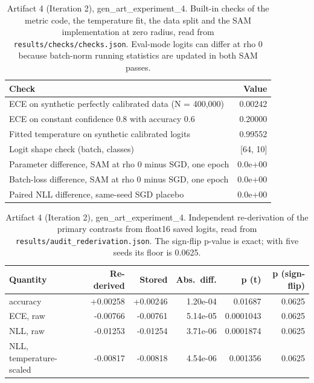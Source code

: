 \documentclass[11pt,letterpaper]{article}
\begin{document}
\begin{table}[!htbp]
\centering
\scriptsize
\caption{Artifact 4 (Iteration 2), gen\_art\_experiment\_4. Built-in checks of the metric code, the temperature fit, the data split and the SAM implementation at zero radius, read from \texttt{results/checks/checks.json}. Eval-mode logits can differ at rho 0 because batch-norm running statistics are updated in both SAM passes.}
\label{tab:checks4}
\begin{tabular}{lr}
\toprule
Check & Value \\
\midrule
ECE on synthetic perfectly calibrated data (N = 400,000) & 0.00242 \\
ECE on constant confidence 0.8 with accuracy 0.6 & 0.20000 \\
Fitted temperature on synthetic calibrated logits & 0.99552 \\
Logit shape check (batch, classes) & [64, 10] \\
Parameter difference, SAM at rho 0 minus SGD, one epoch & 0.0e+00 \\
Batch-loss difference, SAM at rho 0 minus SGD, one epoch & 0.0e+00 \\
Paired NLL difference, same-seed SGD placebo & 0.0e+00 \\
\bottomrule
\end{tabular}
\end{table}
\begin{table}[!htbp]
\centering
\scriptsize
\caption{Artifact 4 (Iteration 2), gen\_art\_experiment\_4. Independent re-derivation of the primary contrasts from float16 saved logits, read from \texttt{results/audit\_rederivation.json}. The sign-flip p-value is exact; with five seeds its floor is 0.0625.}
\label{tab:audit4}
\begin{tabular}{lrrrrr}
\toprule
Quantity & Re-derived & Stored & Abs.\ diff. & p (t) & p (sign-flip) \\
\midrule
accuracy & +0.00258 & +0.00246 & 1.20e-04 & 0.01687 & 0.0625 \\
ECE, raw & -0.00766 & -0.00761 & 5.14e-05 & 0.0001043 & 0.0625 \\
NLL, raw & -0.01253 & -0.01254 & 3.71e-06 & 0.0001874 & 0.0625 \\
NLL, temperature-scaled & -0.00817 & -0.00818 & 4.54e-06 & 0.001356 & 0.0625 \\
\bottomrule
\end{tabular}
\end{table}
\end{document}
